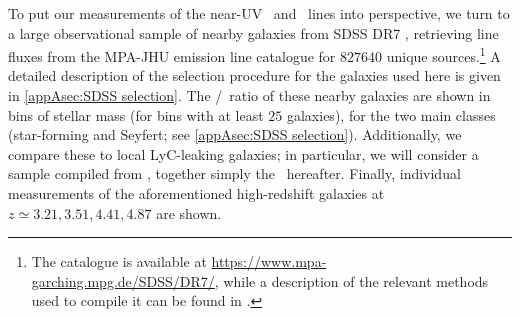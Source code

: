 To put our measurements of the near-UV \NeIII\ and \OII\ lines into perspective, we turn to a large observational sample of nearby galaxies from SDSS DR7 \citep{2009ApJS..182..543A}, retrieving line fluxes from the MPA-JHU emission line catalogue for $\num[group-separator={,}]{827640}$ unique sources.\footnote{The catalogue is available at \url{https://www.mpa-garching.mpg.de/SDSS/DR7/}, while a description of the relevant methods used to compile it can be found in \citet{2004ApJ...613..898T}.} A detailed description of the selection procedure for the galaxies used here is given in \cref{appAsec:SDSS selection}. The \NeIII/\OII\ ratio of these nearby galaxies are shown in bins of stellar mass (for bins with at least $25$ galaxies), for the two main classes (star-forming and Seyfert; see \cref{appAsec:SDSS selection}). Additionally, we compare these to local LyC-leaking galaxies; in particular, we will consider a sample compiled from \citet{2016MNRAS.461.3683I, 2016Natur.529..178I, 2018MNRAS.474.4514I, 2018MNRAS.478.4851I, 2020A&A...639A..85G, 2020MNRAS.497.4293G}, together simply the \Isample\ hereafter. Finally, individual measurements of the aforementioned high-redshift galaxies at $z \simeq 3.21, 3.51, 4.41, 4.87$ \citep[, respectively]{2020MNRAS.491.1093V, 2012MNRAS.427.1953C, 2017ApJ...846L..30S, 2014A&A...563A..58T} are shown.

